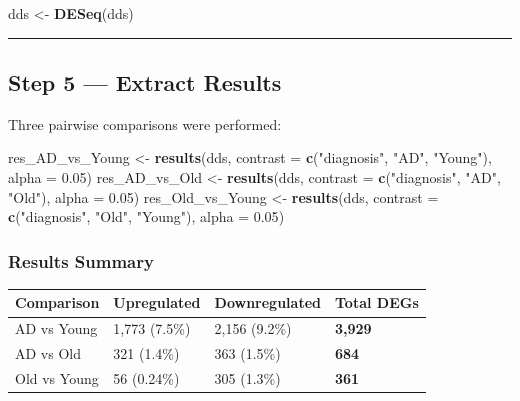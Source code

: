 \documentclass[
]{article}
\newenvironment{Shaded}{\begin{snugshade}}{\end{snugshade}}
\newcommand{\AttributeTok}[1]{\textcolor[rgb]{0.13,0.29,0.53}{#1}}
\newcommand{\FloatTok}[1]{\textcolor[rgb]{0.00,0.00,0.81}{#1}}
\newcommand{\FunctionTok}[1]{\textcolor[rgb]{0.13,0.29,0.53}{\textbf{#1}}}
\newcommand{\NormalTok}[1]{#1}
\newcommand{\OtherTok}[1]{\textcolor[rgb]{0.56,0.35,0.01}{#1}}
\newcommand{\StringTok}[1]{\textcolor[rgb]{0.31,0.60,0.02}{#1}}
\begin{document}
\begin{Shaded}
\begin{Highlighting}[]
\NormalTok{dds }\OtherTok{\textless{}{-}} \FunctionTok{DESeq}\NormalTok{(dds)}
\end{Highlighting}
\end{Shaded}

\begin{center}\rule{0.5\linewidth}{0.5pt}\end{center}

\subsection{Step 5 --- Extract Results}\label{step-5-extract-results}

Three pairwise comparisons were performed:

\begin{Shaded}
\begin{Highlighting}[]
\NormalTok{res\_AD\_vs\_Young }\OtherTok{\textless{}{-}} \FunctionTok{results}\NormalTok{(dds,}
                           \AttributeTok{contrast =} \FunctionTok{c}\NormalTok{(}\StringTok{"diagnosis"}\NormalTok{, }\StringTok{"AD"}\NormalTok{, }\StringTok{"Young"}\NormalTok{),}
                           \AttributeTok{alpha =} \FloatTok{0.05}\NormalTok{)}
\NormalTok{res\_AD\_vs\_Old   }\OtherTok{\textless{}{-}} \FunctionTok{results}\NormalTok{(dds,}
                           \AttributeTok{contrast =} \FunctionTok{c}\NormalTok{(}\StringTok{"diagnosis"}\NormalTok{, }\StringTok{"AD"}\NormalTok{, }\StringTok{"Old"}\NormalTok{),}
                           \AttributeTok{alpha =} \FloatTok{0.05}\NormalTok{)}
\NormalTok{res\_Old\_vs\_Young }\OtherTok{\textless{}{-}} \FunctionTok{results}\NormalTok{(dds,}
                            \AttributeTok{contrast =} \FunctionTok{c}\NormalTok{(}\StringTok{"diagnosis"}\NormalTok{, }\StringTok{"Old"}\NormalTok{, }\StringTok{"Young"}\NormalTok{),}
                            \AttributeTok{alpha =} \FloatTok{0.05}\NormalTok{)}
\end{Highlighting}
\end{Shaded}

\subsubsection{Results Summary}\label{results-summary}

\begin{longtable}[]{@{}llll@{}}
\toprule\noalign{}
Comparison & Upregulated & Downregulated & Total DEGs \\
\midrule\noalign{}
\endhead
\bottomrule\noalign{}
\endlastfoot
AD vs Young & 1,773 (7.5\%) & 2,156 (9.2\%) & \textbf{3,929} \\
AD vs Old & 321 (1.4\%) & 363 (1.5\%) & \textbf{684} \\
Old vs Young & 56 (0.24\%) & 305 (1.3\%) & \textbf{361} \\
\end{longtable}
\end{document}
